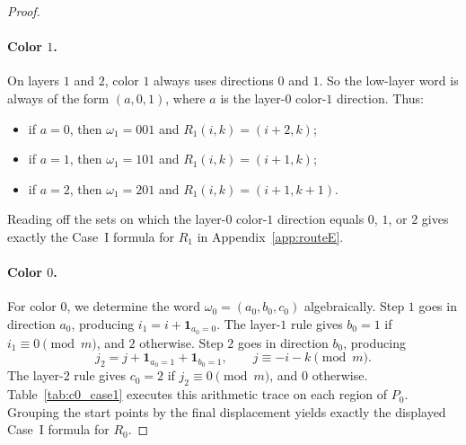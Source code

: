 \documentclass[11pt]{article}
\begin{document}
\begin{proof}
\paragraph{Color $1$.}
On layers $1$ and $2$, color $1$ always uses directions $0$ and $1$.
So the low-layer word is always of the form $(a,0,1)$, where $a$ is the layer-$0$ color-$1$ direction.
Thus:
\begin{itemize}[leftmargin=2em]
\item if $a=0$, then $\omega_1=001$ and $R_1(i,k)=(i+2,k)$;
\item if $a=1$, then $\omega_1=101$ and $R_1(i,k)=(i+1,k)$;
\item if $a=2$, then $\omega_1=201$ and $R_1(i,k)=(i+1,k+1)$.
\end{itemize}
Reading off the sets on which the layer-$0$ color-$1$ direction equals $0$, $1$, or $2$ gives exactly the Case~I formula for $R_1$ in Appendix~\ref{app:routeE}.

\paragraph{Color $0$.}
For color $0$, we determine the word $\omega_0=(a_0,b_0,c_0)$ algebraically.
Step $1$ goes in direction $a_0$, producing $i_1=i+\mathbf{1}_{a_0=0}$.
The layer-$1$ rule gives $b_0=1$ if $i_1\equiv 0 \pmod m$, and $2$ otherwise.
Step $2$ goes in direction $b_0$, producing
\[
j_2=j+\mathbf{1}_{a_0=1}+\mathbf{1}_{b_0=1},\qquad j\equiv -i-k \pmod m.
\]
The layer-$2$ rule gives $c_0=2$ if $j_2\equiv 0 \pmod m$, and $0$ otherwise.
Table~\ref{tab:c0_case1} executes this arithmetic trace on each region of $P_0$.
Grouping the start points by the final displacement yields exactly the displayed Case~I formula for $R_0$.


\end{proof}
\end{document}
